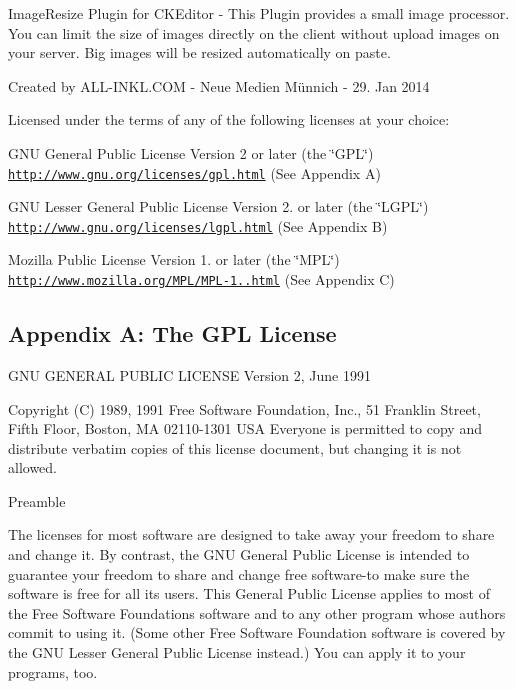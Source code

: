 Image\+Resize Plugin for C\+K\+Editor -\/ This Plugin provides a small image processor. You can limit the size of images directly on the client without upload images on your server. Big images will be resized automatically on paste.

Created by A\+L\+L-\/\+I\+N\+K\+L.\+C\+O\+M -\/ Neue Medien Münnich -\/ 29. Jan 2014

Licensed under the terms of any of the following licenses at your choice\+:


\begin{DoxyItemize}
\item G\+N\+U General Public License Version 2 or later (the \char`\"{}\+G\+P\+L\char`\"{}) \href{http://www.gnu.org/licenses/gpl.html}{\tt http\+://www.\+gnu.\+org/licenses/gpl.\+html} (See Appendix A)
\item G\+N\+U Lesser General Public License Version 2. or later (the \char`\"{}\+L\+G\+P\+L\char`\"{}) \href{http://www.gnu.org/licenses/lgpl.html}{\tt http\+://www.\+gnu.\+org/licenses/lgpl.\+html} (See Appendix B)
\item Mozilla Public License Version 1. or later (the \char`\"{}\+M\+P\+L\char`\"{}) \href{http://www.mozilla.org/MPL/MPL-1.1.html}{\tt http\+://www.\+mozilla.\+org/\+M\+P\+L/\+M\+P\+L-\/1..\+html} (See Appendix C)
\end{DoxyItemize}

\subsection*{Appendix A\+: The G\+P\+L License }

G\+N\+U G\+E\+N\+E\+R\+A\+L P\+U\+B\+L\+I\+C L\+I\+C\+E\+N\+S\+E Version 2, June 1991

Copyright (C) 1989, 1991 Free Software Foundation, Inc., 51 Franklin Street, Fifth Floor, Boston, M\+A 02110-\/1301 U\+S\+A Everyone is permitted to copy and distribute verbatim copies of this license document, but changing it is not allowed.

Preamble

The licenses for most software are designed to take away your freedom to share and change it. By contrast, the G\+N\+U General Public License is intended to guarantee your freedom to share and change free software-\/to make sure the software is free for all its users. This General Public License applies to most of the Free Software Foundation\textquotesingle{}s software and to any other program whose authors commit to using it. (Some other Free Software Foundation software is covered by the G\+N\+U Lesser General Public License instead.) You can apply it to your programs, too.


